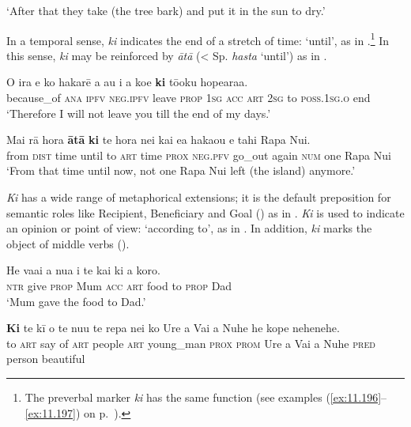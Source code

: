 \glt 
‘After that they take (the tree bark) and put it in the sun to dry.’ \textstyleExampleref{[Ley-5-04.009]}
\z

In a temporal sense, \textit{ki} indicates the end of a stretch of time: ‘until’, as in .\footnote{\label{fn:230}The preverbal marker \textit{ki} has the same function (see examples (\ref{ex:11.196}–\ref{ex:11.197}) on p.~\pageref{ex:11.196}).} In this sense, \textit{ki} may be reinforced by \textit{{\ꞌ}ātā} ({\textless} Sp. \textit{hasta} ‘until’) as in .

\ea\label{ex:4.266}
\gll {\ꞌ}O ira e ko hakarē a au i a koe \textbf{ki} tō{\ꞌ}oku hope{\ꞌ}ara{\ꞌ}a.\\
because\_of \textsc{ana} \textsc{ipfv} \textsc{neg.ipfv} leave \textsc{prop} \textsc{1sg} \textsc{acc} \textsc{art} \textsc{2sg} to \textsc{poss.1sg.o} end\\

\glt 
‘Therefore I will not leave you till the end of my days.’ \textstyleExampleref{[R474.010]} 
\z

\ea\label{ex:4.267}
\gll Mai rā hora \textbf{{\ꞌ}ātā} \textbf{ki} te hora nei kai e{\ꞌ}a haka{\ꞌ}ou e tahi Rapa Nui.\\
from \textsc{dist} time until to \textsc{art} time \textsc{prox} \textsc{neg.pfv} go\_out again \textsc{num} one Rapa Nui\\

\glt 
‘From that time until now, not one Rapa Nui left (the island) anymore.’ \textstyleExampleref{[R303.211]} 
\z

\textit{Ki} has a wide range of metaphorical extensions; it is the default preposition for semantic roles like Recipient, Beneficiary and Goal () as in . \textit{Ki} is used to indicate an opinion or point of view: ‘according to’, as in . In addition, \textit{ki} marks the object of middle verbs ().

\ea\label{ex:4.268}
\gll He va{\ꞌ}ai a nua i te kai ki a koro. \\
\textsc{ntr} give \textsc{prop} Mum \textsc{acc} \textsc{art} food to \textsc{prop} Dad \\

\glt 
‘Mum gave the food to Dad.’ \textstyleExampleref{[R236.078]} 
\z

\ea\label{ex:4.269}
\gll \textbf{Ki} te kī o te nu{\ꞌ}u te repa nei ko Ure {\ꞌ}a Vai {\ꞌ}a Nuhe  he kope nehenehe.\\
to \textsc{art} say of \textsc{art} people \textsc{art} young\_man \textsc{prox} \textsc{prom} Ure a Vai a Nuhe  \textsc{pred} person beautiful\\

